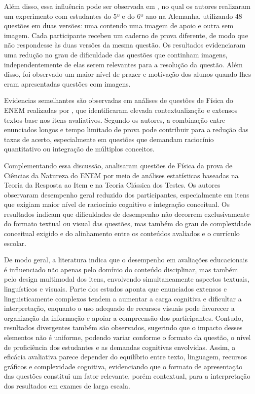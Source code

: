 \documentclass[a4paper,10pt, twocolumn]{article}
\begin{document}
Além disso, essa influência pode ser observada em \textcite{lindner_how_2018}, no qual os autores realizaram um experimento com estudantes do 5º e do 6º ano na Alemanha, utilizando 48 questões em duas versões: uma contendo uma imagem de apoio e outra sem imagem. Cada participante recebeu um caderno de prova diferente, de modo que não respondesse às duas versões da mesma questão. Os resultados evidenciaram uma redução no grau de dificuldade das questões que continham imagens, independentemente de elas serem relevantes para a resolução da questão. Além disso, foi observado um maior nível de prazer e motivação dos alunos quando lhes eram apresentadas questões com imagens. 

Evidencias semelhantes são observadas em análises de questões de Física do ENEM realizadas por \textcite{goncalves2014questoes}, que identificaram elevada contextualização e extensos textos-base nos itens avaliativos. Segundo os autores, a combinação entre enunciados longos e tempo limitado de prova pode contribuir para a redução das taxas de acerto, especialmente em questões que demandam raciocínio quantitativo ou integração de múltiplos conceitos.

Complementando essa discussão, \textcite{lopes2015estudo} analisaram questões de Física da prova de Ciências da Natureza do ENEM por meio de análises estatísticas baseadas na Teoria da Resposta ao Item e na Teoria Clássica dos Testes. Os autores observaram desempenho geral reduzido dos participantes, especialmente em itens que exigiam maior nível de raciocínio cognitivo e integração conceitual. Os resultados indicam que dificuldades de desempenho não decorrem exclusivamente do formato textual ou visual das questões, mas também do grau de complexidade conceitual exigido e do alinhamento entre os conteúdos avaliados e o currículo escolar.

De modo geral, a literatura indica que o desempenho em avaliações educacionais é influenciado não apenas pelo domínio do conteúdo disciplinar, mas também pelo design multimodal dos itens, envolvendo simultaneamente aspectos textuais, linguísticos e visuais. Parte dos estudos aponta que enunciados extensos e linguisticamente complexos tendem a aumentar a carga cognitiva e dificultar a interpretação, enquanto o uso adequado de recursos visuais pode favorecer a organização da informação e apoiar a compreensão dos participantes. Contudo, resultados divergentes também são observados, sugerindo que o impacto desses elementos não é uniforme, podendo variar conforme o formato da questão, o nível de proficiência dos estudantes e as demandas cognitivas envolvidas. Assim, a eficácia avaliativa parece depender do equilíbrio entre texto, linguagem, recursos gráficos e complexidade cognitiva, evidenciando que o formato de apresentação das questões constitui um fator relevante, porém contextual, para a interpretação dos resultados em exames de larga escala. 
\end{document}
